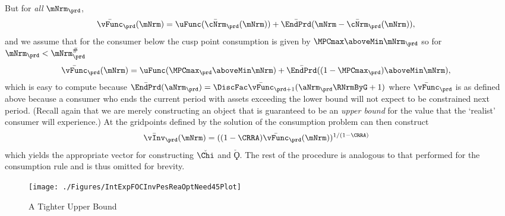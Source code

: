 \documentclass[titlepage, headings=optiontotocandhead]{econark}
\begin{document}
  But for \textit{all} $\mNrm_{\prd}$,
  \begin{equation*}\begin{gathered}\begin{aligned}
        \bar{\vFunc}_{\prd}(\mNrm)  & = \uFunc(\bar{\cNrm}_{\prd}(\mNrm))+ \bar{\EndPrd}(\mNrm-\bar{\cNrm}_{\prd}(\mNrm)),
      \end{aligned}\end{gathered}\end{equation*}
  and we assume that for the consumer below the cusp point consumption is given by $\MPCmax \aboveMin \mNrm_{\prd}$ so for $\mNrm_{\prd}< \mtCusp$
  \begin{equation*}\begin{gathered}\begin{aligned}
        \bar{\vFunc}_{\prd}(\mNrm)  & = \uFunc( \MPCmax_{\prd} \aboveMin \mNrm)+ \bar{\EndPrd}((1-\MPCmax_{\prd})\aboveMin \mNrm),
      \end{aligned}\end{gathered}\end{equation*}
  which is easy to compute because $\bar{\EndPrd}(\aNrm_{\prd}) = \DiscFac \bar{\vFunc}_{\prd+1}(\aNrm_{\prd}\RNrmByG+1)$ where $\bar{\vFunc}_{\prd}$ is as defined above because a consumer who ends the current period with assets exceeding the lower bound will not expect to be constrained next period.  (Recall again that we are merely constructing an object that is guaranteed to be an \textit{upper bound} for the value that the `realist' consumer will experience.)  At the gridpoints defined by the solution of the consumption problem can then construct
  \begin{equation*}\begin{gathered}\begin{aligned}
        \bar{\vInv}_{\prd}(\mNrm)  & = ((1-\CRRA)\bar{\vFunc}_{\prd}(\mNrm))^{1/(1-\CRRA)}
      \end{aligned}\end{gathered}\end{equation*}
 which yields the appropriate vector for constructing $\check{\Chi}$ and $\check{\Koppa}$.  The rest of the procedure is analogous to that performed for the consumption rule and is thus omitted for brevity.




\begin{figure}
  \texttt{[image: ./Figures/IntExpFOCInvPesReaOptNeed45Plot]}
  \caption{A Tighter Upper Bound}
  \label{fig:tighterupper}
\end{figure}
\end{document}
